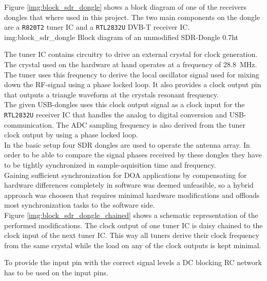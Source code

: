 Figure \ref{img:block_sdr_dongle} shows a block
diagram of one of the receivers dongles that where used
in this project.
The two main components on the dongle are a
\texttt{R820T2} tuner IC \cite{r820t2datasheet}
and a \texttt{RTL2832U} DVB-T receiver IC. \\

             {img:block_sdr_dongle}
             {Block diagram of an unmodified SDR-Dongle}
             {0.7}{ht}

The tuner IC contains circuitry to drive an
external crystal for clock generation.
The crystal used on the hardware at hand
operates at a frequency of \SI{28.8}{\mega\hertz}.
The tuner uses this frequency to derive the
local oscillator signal used for mixing down
the RF-signal using a phase locked loop.
It also provides a clock output pin that
outputs a triangle waveform at the crystals
resonant frequency. \\

The given USB-dongles uses this clock output signal
as a clock input for the \texttt{RTL2832U}
receiver IC that handles the analog to digital
conversion and USB-communication.
The ADC sampling frequency is also derived from
the tuner clock output by using a phase locked loop. \\

In the basic setup four SDR dongles are used
to operate the antenna array.
In order to be able to compare the signal phases
received by these dongles they have to be tightly
synchronized in sample-aquisition time and frequency. \\

Gaining sufficient synchronization for DOA applications
by compensating for hardware differences completely
in software was deemed unfeasible, so a hybrid
approach was choosen that requires minimal hardware
modifications and offloads most synchronization tasks
to the software side. \\


Figure \ref{img:block_sdr_dongle_chained} shows
a schematic representation of the performed modifications.
The clock output of one tuner IC is daisy chained to
the clock input of the next tuner IC.
This way all tuners derive their clock frequency
from the same crystal while the load on any of
the clock outputs is kept minimal.

To provide the input pin with the correct signal
levels a DC blocking RC network has to be used
on the input pins.


